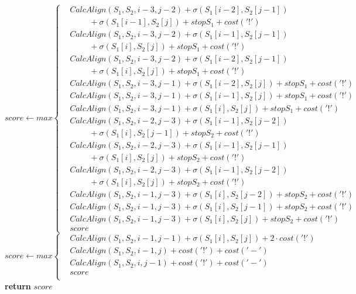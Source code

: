 \begin{algorithm}
	\begin{algorithmic}
		\State $score \gets max\left\{
		\begin{aligned}
			& CalcAlign(S_1, S_2, i-3, j-2) + \sigma(S_1[i-2], S_2[j-1])\\ 
			& \hspace{1cm} + \sigma(S_1[i-1], S_2[j]) + stopS_1 + cost('!')\\
			& CalcAlign(S_1, S_2, i-3, j-2) + \sigma(S_1[i-1], S_2[j-1])\\ 
			& \hspace{1cm} + \sigma(S_1[i], S_2[j]) + stopS_1 + cost('!')\\
			& CalcAlign(S_1, S_2, i-3, j-2) + \sigma(S_1[i-2], S_2[j-1])\\ 
			& \hspace{1cm} + \sigma(S_1[i], S_2[j]) + stopS_1 + cost('!')\\
			& CalcAlign(S_1, S_2, i-3, j-1) + \sigma(S_1[i-2], S_2[j]) + stopS_1 + cost('!')\\
			& CalcAlign(S_1, S_2, i-3, j-1) + \sigma(S_1[i-1], S_2[j]) + stopS_1 + cost('!')\\
			& CalcAlign(S_1, S_2, i-3, j-1) + \sigma(S_1[i], S_2[j]) + stopS_1 + cost('!')\\
			& CalcAlign(S_1, S_2, i-2, j-3) + \sigma(S_1[i-1], S_2[j-2])\\ 
			& \hspace{1cm} + \sigma(S_1[i], S_2[j-1]) + stopS_2 + cost('!')\\
			& CalcAlign(S_1, S_2, i-2, j-3) + \sigma(S_1[i-1], S_2[j-1])\\ 
			& \hspace{1cm} + \sigma(S_1[i], S_2[j]) + stopS_2 + cost('!')\\
			& CalcAlign(S_1, S_2, i-2, j-3) + \sigma(S_1[i-1], S_2[j-2])\\ 
			& \hspace{1cm} + \sigma(S_1[i], S_2[j]) + stopS_2 + cost('!')\\
			& CalcAlign(S_1, S_2, i-1, j-3) + \sigma(S_1[i], S_2[j-2]) + stopS_2 + cost('!')\\
			& CalcAlign(S_1, S_2, i-1, j-3) + \sigma(S_1[i], S_2[j-1]) + stopS_2 + cost('!')\\
			& CalcAlign(S_1, S_2, i-1, j-3) + \sigma(S_1[i], S_2[j]) + stopS_2 + cost('!')\\
			& score
		\end{aligned}
		\right.$
		\Statex {}
		\State $score \gets max\left\{
		\begin{aligned}
			& CalcAlign(S_1, S_2, i-1, j-1) + \sigma(S_1[i], S_2[j]) + 2\cdot cost('!')\\
			& CalcAlign(S_1, S_2, i-1, j) + cost('!') + cost('-')\\
			& CalcAlign(S_1, S_2, i, j-1) + cost('!') + cost('-')\\
			& score\\
		\end{aligned}
		\right.$
		\State \textbf{return} $score$
		\EndProcedure
	\end{algorithmic}
\end{algorithm}

